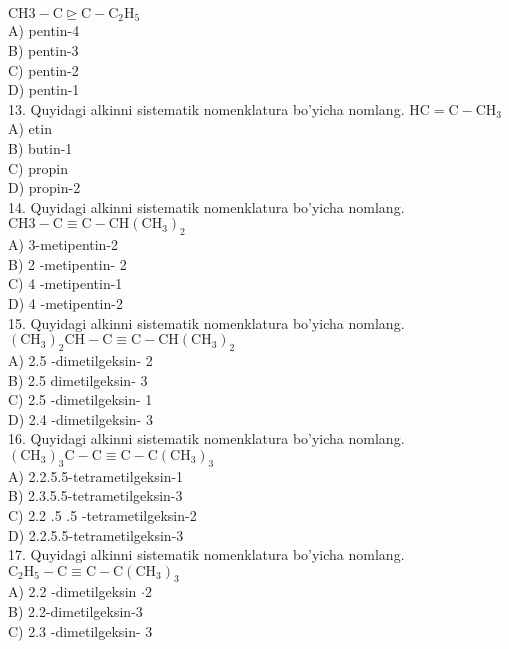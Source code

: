 $\mathrm{CH} 3-\mathrm{C} \unrhd \mathrm{C}-\mathrm{C}_{2} \mathrm{H}_{5}$\\
A) pentin-4\\
B) pentin-3\\
C) pentin-2\\
D) pentin-1\\
13. Quyidagi alkinni sistematik nomenklatura bo'yicha nomlang. $\mathrm{HC}=\mathrm{C}-\mathrm{CH}_{3}$\\
A) etin\\
B) butin-1\\
C) propin\\
D) propin-2\\
14. Quyidagi alkinni sistematik nomenklatura bo'yicha nomlang.\\
$\mathrm{CH} 3-\mathrm{C} \equiv \mathrm{C}-\mathrm{CH}\left(\mathrm{CH}_{3}\right)_{2}$\\
A) 3-metipentin-2\\
B) 2 -metipentin- 2\\
C) 4 -metipentin-1\\
D) 4 -metipentin-2\\
15. Quyidagi alkinni sistematik nomenklatura bo'yicha nomlang.\\
$\left(\mathrm{CH}_{3}\right)_{2} \mathrm{CH}-\mathrm{C} \equiv \mathrm{C}-\mathrm{CH}\left(\mathrm{CH}_{3}\right)_{2}$\\
A) 2.5 -dimetilgeksin- 2\\
B) 2.5 dimetilgeksin- 3\\
C) 2.5 -dimetilgeksin- 1\\
D) 2.4 -dimetilgeksin- 3\\
16. Quyidagi alkinni sistematik nomenklatura bo'yicha nomlang. $\left(\mathrm{CH}_{3}\right)_{3} \mathrm{C}-\mathrm{C} \equiv \mathrm{C}-\mathrm{C}\left(\mathrm{CH}_{3}\right)_{3}$\\
A) 2.2.5.5-tetrametilgeksin-1\\
B) 2.3.5.5-tetrametilgeksin-3\\
C) 2.2 .5 .5 -tetrametilgeksin-2\\
D) 2.2.5.5-tetrametilgeksin-3\\
17. Quyidagi alkinni sistematik nomenklatura bo'yicha nomlang. $\mathrm{C}_{2} \mathrm{H}_{5}-\mathrm{C} \equiv \mathrm{C}-\mathrm{C}\left(\mathrm{CH}_{3}\right)_{3}$\\
A) 2.2 -dimetilgeksin $\cdot 2$\\
B) 2.2-dimetilgeksin-3\\
C) 2.3 -dimetilgeksin- 3\\
